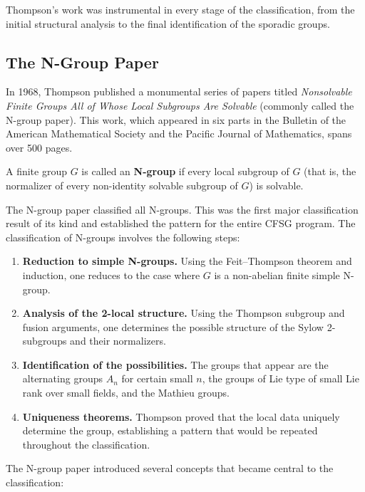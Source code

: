 Thompson's work was instrumental in every stage of the classification, from the initial structural analysis to the final identification of the sporadic groups.

\subsection{The N-Group Paper}

In 1968, Thompson published a monumental series of papers titled \textit{Nonsolvable Finite Groups All of Whose Local Subgroups Are Solvable} (commonly called the N-group paper). This work, which appeared in six parts in the Bulletin of the American Mathematical Society and the Pacific Journal of Mathematics, spans over 500 pages.

\begin{definition}[N-Group]
A finite group \(G\) is called an \textbf{N-group} if every local subgroup of \(G\) (that is, the normalizer of every non-identity solvable subgroup of \(G\)) is solvable.
\end{definition}

The N-group paper classified all N-groups. This was the first major classification result of its kind and established the pattern for the entire CFSG program. The classification of N-groups involves the following steps:

\begin{enumerate}
\item \textbf{Reduction to simple N-groups.} Using the Feit--Thompson theorem and induction, one reduces to the case where \(G\) is a non-abelian finite simple N-group.

\item \textbf{Analysis of the 2-local structure.} Using the Thompson subgroup and fusion arguments, one determines the possible structure of the Sylow 2-subgroups and their normalizers.

\item \textbf{Identification of the possibilities.} The groups that appear are the alternating groups \(A_n\) for certain small \(n\), the groups of Lie type of small Lie rank over small fields, and the Mathieu groups.

\item \textbf{Uniqueness theorems.} Thompson proved that the local data uniquely determine the group, establishing a pattern that would be repeated throughout the classification.
\end{enumerate}

The N-group paper introduced several concepts that became central to the classification:

